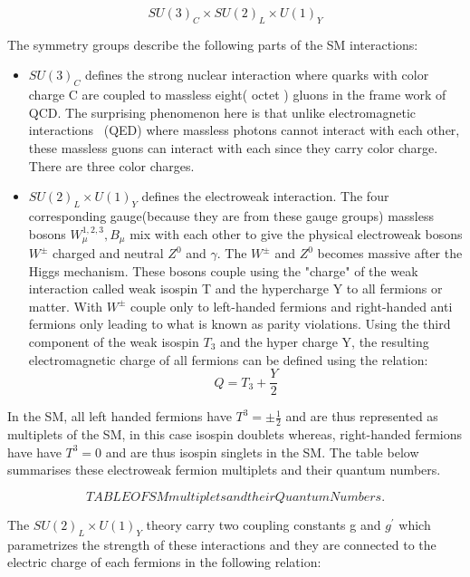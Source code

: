 \begin{equation}
SU(3)_{C} \times SU(2)_{L} \times U(1)_{Y}
\end{equation}

The symmetry groups describe the following parts of the SM interactions:
\begin{itemize}
\item $SU(3)_{C}$ defines the strong nuclear interaction where quarks with color charge C are coupled to massless  eight( octet ) gluons in the frame work of QCD. The surprising phenomenon here is that unlike electromagnetic interactions ~(QED) where massless photons cannot interact with each other, these massless guons can interact with each since they carry color charge. There are three color charges.
\item $SU(2)_{L} \times U(1)_{Y}$ defines the electroweak interaction. The four corresponding gauge(because they are from these gauge groups) massless bosons $W^{1,2,3}_{\mu}, B_{\mu} $ mix with each other to give the physical electroweak bosons $W^{\pm}$ charged and neutral $Z^{0}$ and $\gamma$. The $W^{\pm}$ and $Z^{0}$ becomes massive after the Higgs mechanism. These bosons couple using the "charge" of the weak interaction called weak isospin T and the hypercharge Y to all fermions or matter. With $W^{\pm}$ couple only to left-handed fermions and right-handed anti fermions only leading to what is known as parity violations. Using the third component of the weak isospin $T_{3}$ and the hyper charge Y, the resulting electromagnetic charge of all fermions can be defined using the relation:
\begin{equation}
Q = T_{3} + \frac{Y}{2}
\end{equation}

\end{itemize}
In the SM, all left handed fermions have $T^{3} = \pm \frac{1}{2}$ and are thus represented as multiplets of the SM, in this case isospin doublets whereas, right-handed fermions have have $T^{3} = 0$ and are thus isospin singlets in the SM. The table below summarises these electroweak fermion multiplets and their quantum numbers.

\begin{equation}
TABLE OF SM multiplets and their Quantum Numbers. 
\end{equation}

The $SU(2)_{L} \times U(1)_{Y}$ theory carry two coupling constants g and $g^{\prime}$ which parametrizes the strength of these interactions and they are connected to the electric charge of each fermions in the following relation:

